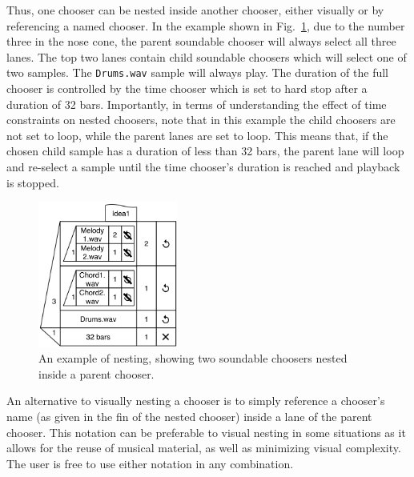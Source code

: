 \documentclass[runningheads,a4paper]{llncs}
\begin{document}
Thus, one chooser can be nested inside another chooser, either visually or by referencing a named chooser. In the example shown in Fig.~\ref{fig:nesting}, due to the number three in the nose cone, the parent soundable chooser will always select all three lanes. The top two lanes contain child soundable choosers which will select one of two samples. The \texttt{Drums.wav} sample will always play. The duration of the full chooser is controlled by the time chooser which is set to hard stop after a duration of 32 bars. Importantly, in terms of understanding the effect of time constraints on nested choosers, note that in this example the child choosers are not set to loop, while the parent lanes are set to loop. This means that, if the chosen child sample has a duration of less than 32 bars, the parent lane will loop and re-select a sample until the time chooser's duration is reached and playback is stopped.



\begin{figure}
	\centering
	\includegraphics[height=4.8cm]{images/nesting.png}
	\caption{An example of nesting, showing two soundable choosers nested
				inside a parent chooser.}\label{fig:nesting}
\end{figure}

An alternative to visually nesting a chooser is to simply reference a chooser's name (as given in the fin of the nested chooser) inside a lane of the parent chooser. This notation can be preferable to visual nesting in some situations as it allows for the reuse of musical material, as well as minimizing visual complexity. The user is free to use either notation in any combination.
\end{document}
